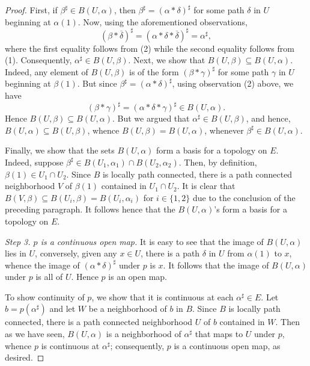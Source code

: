 \documentclass[10pt]{article}
\theoremstyle{thmstyle}
\theoremstyle{defstyle}
\begin{document}
\begin{proof}
First, if $\beta^\sharp\in B(U,\alpha)$, then $\beta^\sharp = (\alpha\ast\delta)^\sharp$ for some path $\delta$ in $U$ beginning at $\alpha(1)$. Now, using the aforementioned observations, 
\begin{equation*}
    (\beta\ast\overline\delta)^\sharp = \left(\alpha\ast\delta\ast\overline\delta\right)^\sharp = \alpha^\sharp,
\end{equation*}
where the first equality follows from (2) while the second equality follows from (1). Consequently, $\alpha^\sharp\in B(U,\beta)$. Next, we show that $B(U,\beta)\subseteq B(U,\alpha)$. Indeed, any element of $B(U,\beta)$ is of the form $(\beta\ast\gamma)^\sharp$ for some path $\gamma$ in $U$ beginning at $\beta(1)$. But since $\beta^\sharp = (\alpha\ast\delta)^\sharp$, using observation (2) above, we have 
\begin{equation*}
    (\beta\ast\gamma)^\sharp = (\alpha\ast\delta\ast\gamma)^\sharp\in B(U,\alpha).
\end{equation*}
Hence $B(U,\beta)\subseteq B(U,\alpha)$. But we argued that $\alpha^\sharp\in B(U,\beta)$, and hence, $B(U,\alpha)\subseteq B(U,\beta)$, whence $B(U,\beta) = B(U,\alpha)$, whenever $\beta^\sharp\in B(U,\alpha)$.

Finally, we show that the sets $B(U,\alpha)$ form a basis for a topology on $E$. Indeed, suppose $\beta^\sharp\in B(U_1,\alpha_1)\cap B(U_2,\alpha_2)$. Then, by definition, $\beta(1)\in U_1\cap U_2$. Since $B$ is locally path connected, there is a path connected neighborhood $V$ of $\beta(1)$ contained in $U_1\cap U_2$. It is clear that $B(V,\beta)\subseteq B(U_i,\beta) = B(U_i,\alpha_i)$ for $i\in\{1, 2\}$ due to the conclusion of the preceding paragraph. It follows hence that the $B(U,\alpha)$'s form a basis for a topology on $E$.

\noindent\emph{Step 3. $p$ is a continuous open map.} It is easy to see that the image of $B(U, \alpha)$ lies in $U$, conversely, given any $x\in U$, there is a path $\delta$ in $U$ from $\alpha(1)$ to $x$, whence the image of $(\alpha\ast\delta)^\sharp$ under $p$ is $x$. It follows that the image of $B(U,\alpha)$ under $p$ is all of $U$. Hence $p$ is an open map.

To show continuity of $p$, we show that it is continuous at each $\alpha^\sharp\in E$. Let $b = p(\alpha^\sharp)$ and let $W$ be a neighborhood of $b$ in $B$. Since $B$ is locally path connected, there is a path connected neighborhood $U$ of $b$ contained in $W$. Then as we have seen, $B(U, \alpha)$ is a neighborhood of $\alpha^\sharp$ that maps to $U$ under $p$, whence $p$ is continuous at $\alpha^\sharp$; consequently, $p$ is a continuous open map, as desired. 


\end{proof}
\end{document}

